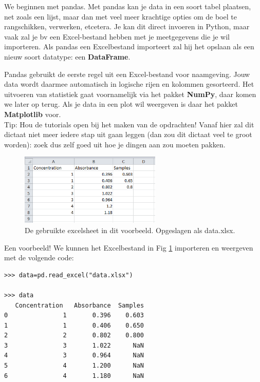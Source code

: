 We beginnen met pandas. Met pandas kan je data in een soort tabel plaatsen, net zoals een lijst, maar dan met veel meer krachtige opties om de boel te rangschikken, verwerken, etcetera. Je kan dit direct invoeren in Python, maar vaak zal je bv een Excel-bestand hebben met je meetgegevens die je wil importeren. Als pandas een Excelbestand importeert zal hij het opslaan als een nieuw soort datatype: een \textbf{DataFrame}. 

Pandas gebruikt de eerste regel uit een Excel-bestand voor naamgeving. Jouw data wordt daarmee automatisch in logische rijen en kolommen gesorteerd. Het uitvoeren van statistiek gaat voornamelijk via het pakket \textbf{NumPy}, daar komen we later op terug. Als je data in een plot wil weergeven is daar het pakket \textbf{Matplotlib} voor. 
\\ Tip: Hou de tutorials open bij het maken van de opdrachten! Vanaf hier zal dit dictaat niet meer iedere stap uit gaan leggen (dan zou dit dictaat veel te groot worden): zoek dus zelf goed uit hoe je dingen aan zou moeten pakken.

\begin{figure}[h]
\begin{center}
\includegraphics[width=0.6\textwidth]{img/excelscreen.PNG}
\caption{\label{fig:excel} De gebruikte excelsheet in dit voorbeeld. Opgeslagen als data.xlsx. }
\end{center}
\end{figure}

Een voorbeeld! We kunnen het Excelbestand in Fig \ref{fig:excel} importeren en weergeven met de volgende code:

\begin{lstlisting}[frame=single]
>>> data=pd.read_excel("data.xlsx")

>>> data
   Concentration   Absorbance  Samples
0               1       0.396    0.603
1               1       0.406    0.650
2               2       0.802    0.800
3               3       1.022      NaN
4               3       0.964      NaN
5               4       1.200      NaN
6               4       1.180      NaN
\end{lstlisting}

